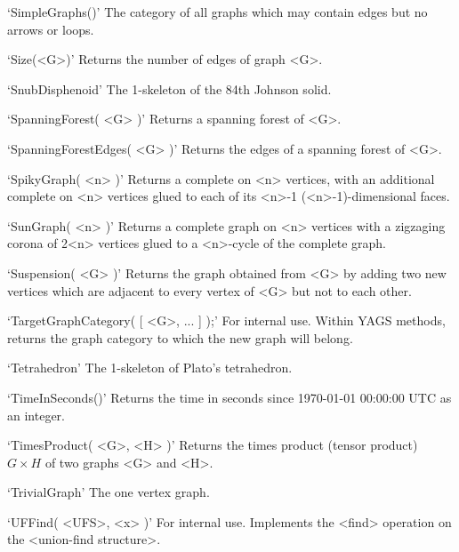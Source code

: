 `SimpleGraphs()'\newline\hglue 5mm 
The category of all graphs which may contain edges but no arrows or loops. 

`Size(<G>)'\newline\hglue 5mm 
Returns the number of edges of graph <G>.

`SnubDisphenoid'\newline\hglue 5mm 
The 1-skeleton of the 84th Johnson solid.

`SpanningForest( <G> )'\newline\hglue 5mm 
Returns a spanning forest of <G>.

`SpanningForestEdges( <G> )'\newline\hglue 5mm 
Returns the edges of a spanning forest of <G>.

`SpikyGraph( <n> )'\newline\hglue 5mm 
Returns a complete on <n> vertices, with an additional complete on <n> vertices glued to each of its <n>-1
 (<n>-1)-dimensional faces.

`SunGraph( <n> )'\newline\hglue 5mm 
Returns a complete graph on <n> vertices with a zigzaging corona of 2<n> vertices glued to a <n>-cycle of the complete graph.

`Suspension( <G> )'\newline\hglue 5mm 
Returns the graph obtained from  <G> by adding two new vertices which are adjacent to every
vertex of <G> but not to each other.

`TargetGraphCategory( [ <G>, ... ] );'\newline\hglue 5mm 
For internal use. Within YAGS methods, returns the graph category to which the new graph will belong.

`Tetrahedron'\newline\hglue 5mm 
The 1-skeleton of Plato's tetrahedron.

`TimeInSeconds()'\newline\hglue 5mm 
Returns the time in seconds since 1970-01-01 00:00:00 UTC as an integer.

`TimesProduct( <G>, <H> )'\newline\hglue 5mm 
Returns  the  times  product (tensor product) $G  \times  H$ of two graphs <G> and <H>.

`TrivialGraph'\newline\hglue 5mm 
The one vertex graph.

`UFFind( <UFS>, <x> )'\newline\hglue 5mm 
For  internal  use.  Implements  the  <find>  operation on the <union-find structure>. 


